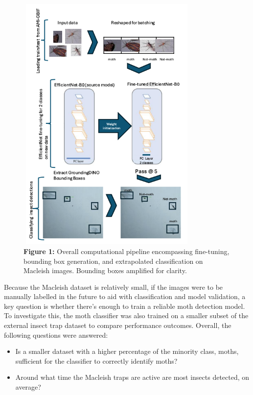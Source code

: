 \documentclass[twocolumn]{article}
\newcommand\tab[1][1cm]{\hspace*{#1}}
\begin{document}
    \begin{figure}[!t]
        \begin{varwidth}{0.5\textwidth}
            \includegraphics[width=9cm, height=13cm]{imgs/try.png}
            \captionsetup{width=0.9\textwidth}
            \caption*{\textbf{Figure 1:} Overall computational pipeline encompassing fine-tuning, 
            bounding box generation, and extrapolated classification on Macleish images.
            Bounding boxes amplified for clarity.} 
        \end{varwidth}
    \end{figure}
    \tab Because the Macleish dataset is relatively small,  
    if 
    the images were to be manually labelled in the future to aid with classification
    and model validation,
    a key question is whether there's enough to train a reliable moth detection model. 
    To investigate this, the moth classifier was also trained on a smaller subset 
    of the external insect trap dataset to compare performance outcomes. \newline
Overall, the following questions were answered:
 \begin{itemize} 
    \item Is a smaller dataset with a higher percentage of the minority class, moths,
    sufficient for the classifier to correctly identify moths?
    \item Around what time the Macleish traps are active are most insects detected, on average? 
\end{itemize} 
\end{document}
